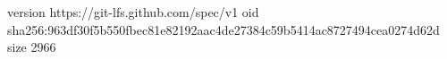 version https://git-lfs.github.com/spec/v1
oid sha256:963df30f5b550fbec81e82192aac4de27384c59b5414ac8727494cea0274d62d
size 2966
